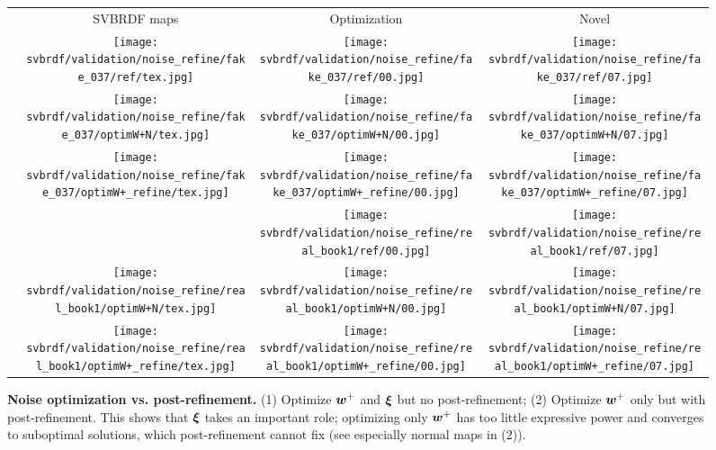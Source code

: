 \begin{figure}[h!]
	\centering
	\setlength{\resLen}{1.in}
	\setlength{\raiseLen}{0.4in}
	\addtolength{\tabcolsep}{-4pt}
	\begin{tabular}{cccc}
		& SVBRDF maps & Optimization & Novel
		\\
		\raisebox{\raiseLen}{\rotatebox[origin=c]{90}{GT}} &
		\texttt{[image: svbrdf/validation/noise\_refine/fake\_037/ref/tex.jpg]} &
		\texttt{[image: svbrdf/validation/noise\_refine/fake\_037/ref/00.jpg]} &
		\texttt{[image: svbrdf/validation/noise\_refine/fake\_037/ref/07.jpg]}
		\\
		\raisebox{\raiseLen}{\rotatebox[origin=c]{0}{(1)}} &
		\texttt{[image: svbrdf/validation/noise\_refine/fake\_037/optimW+N/tex.jpg]} &
		\texttt{[image: svbrdf/validation/noise\_refine/fake\_037/optimW+N/00.jpg]} &
		\texttt{[image: svbrdf/validation/noise\_refine/fake\_037/optimW+N/07.jpg]}
		\\
		\raisebox{\raiseLen}{\rotatebox[origin=c]{0}{(2)}} &
		\texttt{[image: svbrdf/validation/noise\_refine/fake\_037/optimW+\_refine/tex.jpg]} &
		\texttt{[image: svbrdf/validation/noise\_refine/fake\_037/optimW+\_refine/00.jpg]} &
		\texttt{[image: svbrdf/validation/noise\_refine/fake\_037/optimW+\_refine/07.jpg]}
		\\
		\raisebox{\raiseLen}{\rotatebox[origin=c]{90}{GT}} &
		 &
		\texttt{[image: svbrdf/validation/noise\_refine/real\_book1/ref/00.jpg]} &
		\texttt{[image: svbrdf/validation/noise\_refine/real\_book1/ref/07.jpg]}
		\\
		\raisebox{\raiseLen}{\rotatebox[origin=c]{0}{(1)}} &
		\texttt{[image: svbrdf/validation/noise\_refine/real\_book1/optimW+N/tex.jpg]} &
		\texttt{[image: svbrdf/validation/noise\_refine/real\_book1/optimW+N/00.jpg]} &
		\texttt{[image: svbrdf/validation/noise\_refine/real\_book1/optimW+N/07.jpg]}
		\\
		\raisebox{\raiseLen}{\rotatebox[origin=c]{0}{(2)}} &
		\texttt{[image: svbrdf/validation/noise\_refine/real\_book1/optimW+\_refine/tex.jpg]} &
		\texttt{[image: svbrdf/validation/noise\_refine/real\_book1/optimW+\_refine/00.jpg]} &
		\texttt{[image: svbrdf/validation/noise\_refine/real\_book1/optimW+\_refine/07.jpg]}
	\end{tabular}
	\caption[Noise optimization vs. post-refinement]{\label{fig:svbrdf:noise_vs_refine}
		\textbf{Noise optimization vs. post-refinement.} (1) Optimize $\bm{w}^+$ and $\bm\xi$ but no post-refinement; (2) Optimize $\bm{w}^+$ only but with post-refinement. This shows that $\bm\xi$ takes an important role; optimizing only $\bm{w}^+$ has too little expressive power and converges to suboptimal solutions, which post-refinement cannot fix (see especially normal maps in (2)).
	}
\end{figure}